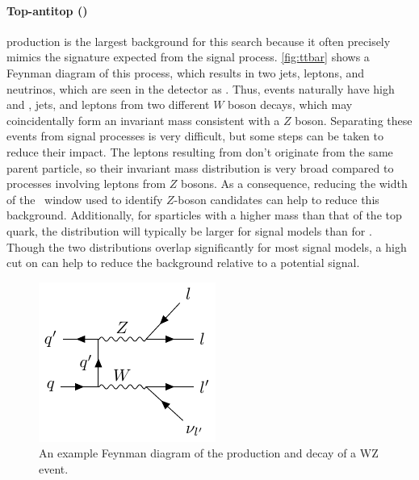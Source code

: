 \paragraph{Top-antitop (\ttbar)} production is the largest background for this search because it often precisely mimics the signature expected from the signal process. \autoref{fig:ttbar} shows a Feynman diagram of this process, which results in two jets, leptons, and neutrinos, which are seen in the detector as \MET. Thus, \ttbar events naturally have high \MET and \HT, jets, and leptons from two different $W$ boson decays, which may coincidentally form an invariant mass consistent with a $Z$ boson. Separating these events from signal processes is very difficult, but some steps can be taken to reduce their impact. The leptons resulting from \ttbar don't originate from the same parent particle, so their invariant mass distribution is very broad compared to processes involving leptons from $Z$ bosons. As a consequence, reducing the width of the \mll~window used to identify $Z$-boson candidates can help to reduce this background. Additionally, for sparticles with a higher mass than that of the top quark, the \HT distribution will typically be larger for signal models than for \ttbar. Though the two \HT distributions overlap significantly for most signal models, a high cut on \HT can help to reduce the \ttbar background relative to a potential signal.  

\begin{centering}
\begin{figure}[bth]
\myfloatalign
\includegraphics[width=.70\linewidth]{feynman/diboson.pdf}
\caption{An example Feynman diagram of the production and decay of a WZ event.}
\label{fig:diboson}
\end{figure}
\end{centering}

